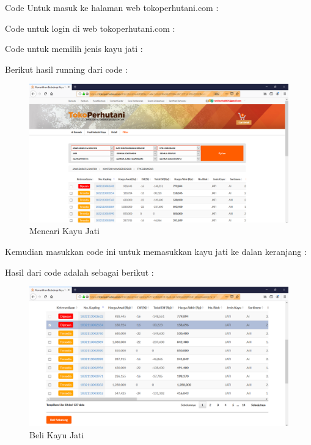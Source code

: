 Code Untuk masuk ke halaman web tokoperhutani.com :


Code untuk login di web tokoperhutani.com :


Code untuk memilih jenis kayu jati :


Berikut hasil running dari code :
\begin{figure}[h]
	\centering
	\includegraphics[scale=0.25]{figures/jatii}
	\caption{Mencari Kayu Jati}
\end{figure}

Kemudian masukkan code ini untuk memasukkan kayu jati ke dalan keranjang :


Hasil dari code adalah sebagai berikut :
\begin{figure}[h]
	\centering
	\includegraphics[scale=0.25]{figures/belii}
	\caption{Beli Kayu Jati}
\end{figure}

